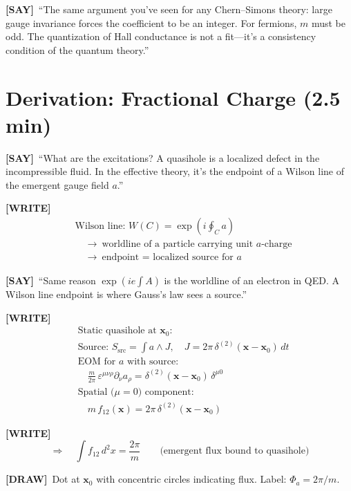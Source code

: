 \documentclass[11pt]{article}
\newcommand{\WRITE}{\textcolor{writecol}{\textbf{[WRITE]}}}
\newcommand{\SAY}{\textcolor{saycol}{\textbf{[SAY]}}}
\newcommand{\DRAW}{\textcolor{drawcol}{\textbf{[DRAW]}}}
\begin{document}
\SAY\ ``The same argument you've seen for any Chern--Simons theory: large gauge invariance forces the coefficient to be an integer. For fermions, $m$ must be odd. The quantization of Hall conductance is not a fit---it's a consistency condition of the quantum theory.''

\section{Derivation: Fractional Charge (2.5 min)}

\SAY\ ``What are the excitations? A quasihole is a localized defect in the incompressible fluid. In the effective theory, it's the endpoint of a Wilson line of the emergent gauge field $a$.''

\WRITE
\begin{align*}
&\text{Wilson line: } W(C) = \exp\!\left(i\oint_C\! a\right)\\[4pt]
&\quad\to\ \text{worldline of a particle carrying unit }a\text{-charge}\\
&\quad\to\ \text{endpoint = localized source for }a
\end{align*}

\SAY\ ``Same reason $\exp(ie\!\int\!A)$ is the worldline of an electron in QED. A Wilson line endpoint is where Gauss's law sees a source.''

\WRITE
\begin{align*}
&\text{Static quasihole at }\mathbf{x}_0:\\[4pt]
&\text{Source: } S_{\mathrm{src}} = \int\! a\wedge J,\quad J = 2\pi\,\delta^{(2)}(\mathbf{x}-\mathbf{x}_0)\,dt\\[6pt]
&\text{EOM for }a\text{ with source:}\\[4pt]
&\quad\frac{m}{2\pi}\,\varepsilon^{\mu\nu\rho}\partial_\nu a_\rho = \delta^{(2)}(\mathbf{x}-\mathbf{x}_0)\,\delta^{\mu 0}\\[4pt]
&\text{Spatial ($\mu=0$) component:}\\[4pt]
&\quad m\,f_{12}(\mathbf{x}) = 2\pi\,\delta^{(2)}(\mathbf{x}-\mathbf{x}_0)
\end{align*}

\WRITE
\begin{equation*}
\Longrightarrow\quad \int\! f_{12}\,d^2x = \frac{2\pi}{m} \qquad\text{(emergent flux bound to quasihole)}
\end{equation*}

\DRAW\ Dot at $\mathbf{x}_0$ with concentric circles indicating flux. Label: $\Phi_a = 2\pi/m$.
\end{document}
